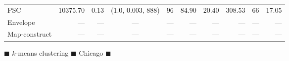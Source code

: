 \documentclass[11pt]{article}
\begin{document}
\begin{figure}
\begin{center}
\begin{minipage}{\textwidth}
{\begin{tabular}{@{}lrrcrrrrrr@{}}
        PSC & 10375.70 & 0.13 & (1.0, 0.003, 888) & 96 & 84.90 & 20.40 & 308.53 & 66 & 17.05\\
        Envelope & --- & --- & --- & --- & --- & --- & --- & --- & ---\\
        Map-construct & --- & --- & --- & --- & --- & --- & --- & --- & ---\\
        \bottomrule
    \end{tabular}
    }
    \end{minipage}
%
        \caption{$\blacksquare$ $k$-means clustering $\blacksquare$ Chicago   $\blacksquare$}
%
    \end{center} \end{figure}
\clearpage
\newpage 
%
\clearpage
\end{document}
